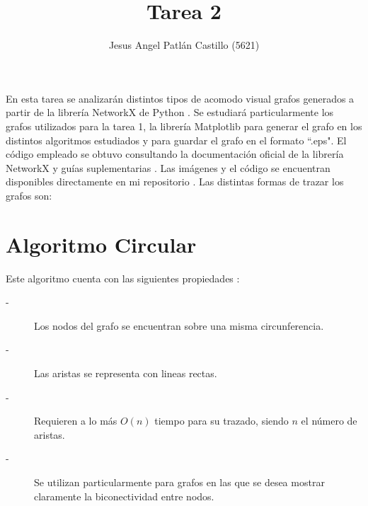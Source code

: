 \documentclass{article}
\title{Tarea 2}
\author{Jesus Angel Patlán Castillo (5621)}
\date{\displaydate{date}}
\begin{document}
 
 
\lstset{style=mystyle}


\maketitle

En esta tarea se analizarán distintos tipos de acomodo visual grafos generados a partir de la librería NetworkX \cite{NetworkX} de Python \cite{Python}. Se estudiará particularmente los grafos utilizados para la tarea 1, la librería Matplotlib \cite{Matplotlib} para generar el grafo en los distintos algoritmos estudiados y para guardar el grafo en el formato ``.eps". El código empleado se obtuvo consultando la documentación oficial de la librería NetworkX \cite{NetworkXD} y guías suplementarias \cite{SOQ1,SOQ2}. Las imágenes y el código se encuentran disponibles directamente en mi repositorio \cite{JAPC}. Las distintas formas de trazar los grafos son:



\section{Algoritmo Circular}
Este algoritmo cuenta con las siguientes propiedades \cite{six1999framework}:
\begin{description}
\item[-]Los nodos del grafo se  encuentran sobre una misma circunferencia.
\item[-]Las aristas se representa con lineas rectas.
\item[-]Requieren a lo más $O(n)$ tiempo para su trazado, siendo $n$ el número de aristas.
\item[-]Se utilizan particularmente para grafos en las que se desea mostrar claramente la biconectividad entre nodos.
\end{description}
\end{document}

